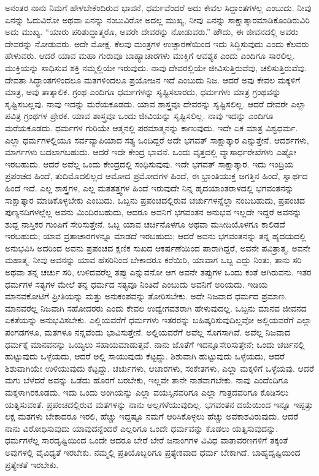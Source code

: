 ಅನಂತರ ನಾನು ನಿಮಗೆ ಹೇಳಬೇಕೆಂದಿರುವ ಭಾವನೆ, ಧರ್ಮವೆಂದರೆ ಅದು ಕೇವಲ ಸಿದ್ದಾಂತಗಳಲ್ಲ ಎಂಬುದು. ನೀವು ಏನನ್ನು ಓದುವಿರೋ ಅಥವಾ ಏನನ್ನು ನಂಬುವಿರೋ ಅದಲ್ಲ ಮುಖ್ಯ, ನೀವು ಏನನ್ನು ಸಾಕ್ಷಾತ್ಕಾರಮಾಡಿಕೊಂಡಿರುವಿರಿ ಅದು ಮುಖ್ಯ. “ಯಾರು ಪರಿಶುದ್ಧಾತ್ಮರೊ, ಅವರೇ ದೇವರನ್ನು ನೋಡುವರು.” ಹೌದು, ಈ ಜೀವನದಲ್ಲಿ ಅವರು ದೇವರನ್ನು ನೋಡುವರು. ಅದೇ ಮೋಕ್ಷ. ಕೆಲವು ಮಂತ್ರಗಳ ಉಚ್ಚಾರಣೆಯಿಂದ ಇದು ಸಿದ್ಧಿಸುವುದು ಎಂದು ಕೆಲವರು ಹೇಳುವರು. ಆದರೆ ಯಾವ ಮಹಾ ಗುರುವೂ ಬಾಹ್ಯಾಚಾರಗಳು ಮುಕ್ತಿಗೆ ಆವಶ್ಯಕ ಎಂದು ಎಂದಿಗೂ ಸಾರಲಿಲ್ಲ. ಮುಕ್ತಿಯನ್ನು ಸಾಧಿಸುವ ಶಕ್ತಿ ನಮ್ಮಲ್ಲಿಯೇ ಇರುವುದು. ನಾವು ದೇವರಲ್ಲಿಯೇ ಜೀವಿಸುತ್ತಿರುವೆವು, ಚಲಿಸುತ್ತಿರುವೆವು. ದೇವತಾ ಸಿದ್ಧಾಂತಗಳಿಂದಲೂ ಮತಗಳಿಂದಲೂ ಪ್ರಯೋಜನ ಇದೆ ಎಂಬುದು ನಿಜ. ಆದರೆ ಅವು ಕೇವಲ ಮಕ್ಕಳಿಗೆ ಮಾತ್ರ, ಅವು ತಾತ್ಕಾಲಿಕ. ಗ್ರಂಥ ಎಂದಿಗೂ ಧರ್ಮಗಳನ್ನು ಸೃಷ್ಟಿಸಲಾರದು, ಧರ್ಮಗಳು ಮಾತ್ರ ಗ್ರಂಥವನ್ನು ಸೃಷ್ಟಿಸಬಲ್ಲವು. ನಾವು ಇದನ್ನು ಮರೆಯಕೂಡದು. ಯಾವ ಶಾಸ್ತ್ರವೂ ದೇವರನ್ನು ಸೃಷ್ಟಿಸಲಿಲ್ಲ. ಆದರೆ ದೇವರೇ ಎಲ್ಲಾ ಪವಿತ್ರ ಗ್ರಂಥಗಳ ಪ್ರೇರಕ. ಯಾವ ಶಾಸ್ತ್ರವೂ ಒಂದು ಜೀವಿಯನ್ನು ಸೃಷ್ಟಿಸಲಿಲ್ಲ. ನಾವು ಇದನ್ನು ಎಂದಿಗೂ ಮರೆಯಕೂಡದು. ಧರ್ಮಗಳ ಗುರಿಯೇ ಆತ್ಮನಲ್ಲಿ ಪರಮಾತ್ಮನನ್ನು ಕಾಣುವುದು. ಇದೇ ಏಕ ಮಾತ್ರ ವಿಶ್ವಧರ್ಮ. ಎಲ್ಲಾ ಧರ್ಮಗಳಲ್ಲಿಯೂ ಸರ್ವವ್ಯಾಪಿಯಾದ ಸತ್ಯ ಒಂದಿದ್ದರೆ ಅದೇ ಭಗವತ್ ಸಾಕ್ಷಾತ್ಕಾರ ಎನ್ನುತ್ತೇನೆ. ಆದರ್ಶಗಳು, ಮಾರ್ಗಗಳು ಬದಲಾಗಬಹುದು. ಆದರೆ ಇದೇ ಕೇಂದ್ರ ಭಾವನೆ. ಒಂದು ವೃತ್ತದಲ್ಲಿ ವ್ಯಾಸಾರ್ಧರೇಖೆಗಳು ಎಷ್ಟೋ ಇರಬಹುದು. ಆದರೆ ಅವೆಲ್ಲ ಒಂದು ಕೇಂದ್ರದಲ್ಲಿ ಸಂಧಿಸುವುವು. ಇದೇ ಭಗವತ್ ಸಾಕ್ಷಾತ್ಕಾರ. ಇದು ಇಂದ್ರಿಯ ಪ್ರಪಂಚದ ಹಿಂದೆ, ತುದಿಮೊದಲಿಲ್ಲದ ಆಮೋದ ಪ್ರಮೋದಗಳ ಹಿಂದೆ, ಈ ಭ್ರಾಂತಿಯುಕ್ತ ಜಗತ್ತಿನ ಹಿಂದೆ, ಸ್ವಾರ್ಥದ ಹಿಂದೆ ಇದೆ. ಎಲ್ಲ ಶಾಸ್ತ್ರಗಳ, ಎಲ್ಲ ಮತತತ್ತ್ವಗಳ ಹಿಂದೆ ಇರುವುದೇ ನಿನ್ನ ಹೃದಯಾಂತರಾಳದಲ್ಲಿ ಭಗವಂತನನ್ನು ಸಾಕ್ಷಾತ್ಕಾರ ಮಾಡಿಕೊಳ್ಳಬೇಕು ಎಂಬುದು. ಒಬ್ಬನು ಪ್ರಪಂಚದಲ್ಲಿರುವ ಚರ್ಚುಗಳನ್ನೆಲ್ಲಾ ನಂಬಬಹುದು, ಪ್ರಪಂಚದ ಪುಣ್ಯನದಿಗಳಲ್ಲೆಲ್ಲ ಅವನು ಮಿಂದಿರಬಹುದು, ಆದರೂ ಅವನಿಗೆ ಭಗವಂತನ ಅನುಭವ ಇಲ್ಲದೇ ಇದ್ದರೆ ಅವನನ್ನು ಶುದ್ದ ನಾಸ್ತಿಕರ ಗುಂಪಿಗೆ ಸೇರಿಸುತ್ತೇನೆ. ಒಬ್ಬ ಯಾವ ಚರ್ಚಿನೊಳಗೂ ಅಥವಾ ಮಸೀದಿಯೊಳಗೂ ಕಾಲಿಡದೆ ಇರಬಹುದು; ಯಾವ ವ್ರತಾಚಾರಗಳನ್ನೂ ಮಾಡದೆ ಇರಬಹುದು; ಆದರೆ ಅವನು ಭಗವಂತನನ್ನು ತನ್ನ ಹೃದಯದಲ್ಲಿ ಅನುಭವಿಸಿ ಅದರಿಂದ ಅವನು ಪ್ರಪಂಚದ ಕ್ಷಣಿಕ ಸುಖದ ಆಕರ್ಷಣೆಯಿಂದ ಪಾರಾಗಿದ್ದರೆ, ಅವನೇ ಪವಿತ್ರಾತ್ಮ, ಅವನೇ ಮಹಾತ್ಮ. ನೀವು ಅವನನ್ನು ಯಾವ ಹೆಸರಿನಿಂದ ಬೇಕಾದರೂ ಕರೆಯಿರಿ, ಯಾವಾಗ ಒಬ್ಬ ಎದ್ದು ನಿಂತು, ತಾನು ಸರಿ ಅಥವಾ ತನ್ನ ಚರ್ಚು ಸರಿ, ಉಳಿದವರೆಲ್ಲ ತಪ್ಪು ಎನ್ನುವನೋ ಆಗ ಅವನೇ ತಪ್ಪುಗಳ ಒಂದು ಕಂತೆ ಆಗಿರುವನು. ಇತರ ಧರ್ಮಗಳ ಸತ್ಯಗಳ ಮೇಲೆ ತನ್ನ ಧರ್ಮದ ಸತ್ಯವೂ ನಿಂತಿದೆ ಎಂಬುದು ಅವನಿಗೆ ಅರಿಯದು. ಇಡಿಯ ಮಾನವಕೋಟಿಗೆ ಪ್ರೀತಿಯನ್ನು ಮತ್ತು ಅನುಕಂಪವನ್ನು ತೋರಿಸಬೇಕು. ಅದೇ ನಿಜವಾದ ಧರ್ಮದ ಪ್ರಮಾಣ. ಮಾನವರೆಲ್ಲ ನಿಜವಾಗಿ ಸಹೋದರರು ಎಂದು ಕೇವಲ ಉದ್ವೇಗವಶರಾಗಿ ಹೇಳುವುದಲ್ಲ. ಒಬ್ಬನು ಮಾನವ ಜೀವನದ ಏಕತೆಯನ್ನು ಅನುಭವಿಸಬೇಕು. ಎಲ್ಲಿಯವರೆಗೆ ಧರ್ಮಗಳು ಇತರರನ್ನು ಬಹಿಷ್ಕರಿಸುವುದಿಲ್ಲವೋ ಅಲ್ಲಿಯವರೆಗೆ ಎಲ್ಲಾ ಪಂಗಡಗಳೂ, ಮತಗಳೂ ನನ್ನವೆಂದು ಭಾವಿಸುತ್ತೇನೆ. ಅಲ್ಲಿಯವರೆಗೆ ಅವೆಲ್ಲ ಸೊಗಸಾಗಿವೆ. ಅವೆಲ್ಲ ನಿಜವಾದ ಧರ್ಮಕ್ಕೆ ಮಾನವನನ್ನು ಒಯ್ಯಲು ಸಹಾಯಮಾಡುತ್ತವೆ. ನಾನು ಜೊತೆಗೆ ಇದನ್ನೂ\break ಸೇರಿಸುತ್ತೇನೆ; ಒಂದು ಚರ್ಚಿನಲ್ಲಿ ಹುಟ್ಟುವುದು ಒಳ್ಳೆಯದು, ಆದರೆ ಅಲ್ಲಿ ಸಾಯುವುದು ಕೆಟ್ಟದ್ದು. ಶಿಶುವಾಗಿ ಹುಟ್ಟುವುದು ಒಳ್ಳೆಯದು, ಆದರೆ ಶಿಶುವಾಗಿಯೇ ಉಳಿಯುವುದು ಕೆಟ್ಟದ್ದು. ಚರ್ಚುಗಳು, ಆಚಾರಗಳು, ಸಂಕೇತಗಳು, ಎಲ್ಲಾ ಮಕ್ಕಳಿಗೆ ಒಳ್ಳೆಯವು. ಆದರೆ ಮಗು ಬೆಳೆದರೆ ಅವನ್ನು ಒಡೆದು ಹೊರಗೆ ಬರಬೇಕು, ಇಲ್ಲವೇ ತಾನೇ ನಾಶವಾಗಬೇಕು. ನಾವು ಎಂದೆಂದಿಗೂ ಮಕ್ಕಳಾಗಿರಕೂಡದು. ಇದು ಒಂದು ಅಂಗಿಯನ್ನು ಎಲ್ಲಾ ವಯಸ್ಸಿನವರಿಗೂ ಎಲ್ಲಾ ಗಾತ್ರದವರಿಗೂ ಕೊಡಿಸಲು ಯತ್ನಿಸುವಂತೆ. ಪ್ರಪಂಚದಲ್ಲಿರುವ ಮತಗಳನ್ನು ನಾನು ಅಲ್ಲಗಳೆಯುವುದಿಲ್ಲ. ಭಗವಂತನ ದಯೆಯಿಂದ ಇನ್ನೂ ಇಪ್ಪತ್ತು ಲಕ್ಷ ಮತಗಳು ಬೇಕಾದರೂ ಇರಲಿ, ಹೆಚ್ಚು ಇದ್ದಷ್ಟೂ ನಮಗೆ ಆರಿಸಿಕೊಳ್ಳಲು ಹೆಚ್ಚು ಅವಕಾಶವಿರುವುದು. ಆದರೆ ನಾನು ವಿರೋಧಿಸುವುದು ಯಾವುದನ್ನೆಂದರೆ ಎಲ್ಲರಿಗೂ ಒಂದೇ ಧರ್ಮವನ್ನು ಕೊಡಲು ಯತ್ನಿಸುವುದನ್ನು. ಧರ್ಮಗಳೆಲ್ಲ ಸಾರದೃಷ್ಟಿಯಿಂದ ಒಂದೇ ಆದರೂ ಬೇರೆ ಬೇರೆ ಜನಾಂಗಗಳ ವಿವಿಧ ವಾತಾವರಣಗಳಿಗೆ ತಕ್ಕಂತೆ ಅವುಗಳಲ್ಲಿ ವೈವಿಧ್ಯತೆ ಇರಬೇಕು. ನಮ್ಮಲ್ಲಿ ಪ್ರತಿಯೊಬ್ಬರಿಗೂ ಪ್ರತ್ಯೇಕವಾದ ಧರ್ಮ ಬೇಕಾಗಿದೆ. ಬಾಹ್ಯದೃಷ್ಟಿಯಿಂದ ಪ್ರತ್ಯೇಕತೆ ಇರಬೇಕು.

